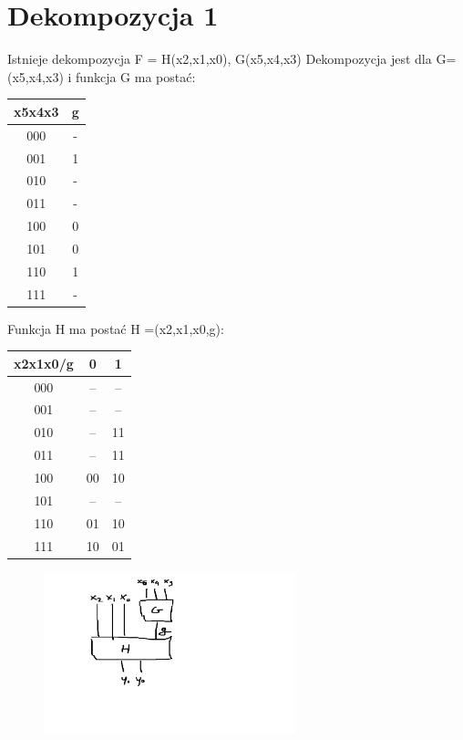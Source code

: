 \documentclass[]{article}
\begin{document}
\section{Dekompozycja 1}
 Istnieje dekompozycja F = H(x2,x1,x0), G(x5,x4,x3)
\newline
 Dekompozycja jest dla G=(x5,x4,x3) i funkcja G ma postać:
\newline
\newline
\begin{tabular}[]{|c|c|}
\hline
   \footnotesize{x5x4x3} & \footnotesize{g}\\
\hline   
   000 & -\\
   001 & 1\\
   010 & -\\
   011 & -\\
   100 & 0\\
   101 & 0\\
   110 & 1\\
   111 & -\\
\hline
\end{tabular}
\newline
\newline
Funkcja H ma postać H =(x2,x1,x0,g):
\newline
\newline
\begin{tabular}[]{|c|c|c|}
\hline
   \footnotesize{x2x1x0/g} & \footnotesize{0} & \footnotesize{1}\\
\hline   
   000 & -- & --\\
   001 & -- & --\\
   010 & -- & 11\\
   011 & -- & 11\\
   100 & 00 & 10\\
   101 & -- & --\\
   110 & 01 & 10\\
   111 & 10 & 01\\
\hline
\end{tabular}
\newline
\newline
\begin{figure}[H]
	\centering
	\includegraphics[width=0.65\textwidth]{1.0.png}
\end{figure}
\newpage
\end{document}
